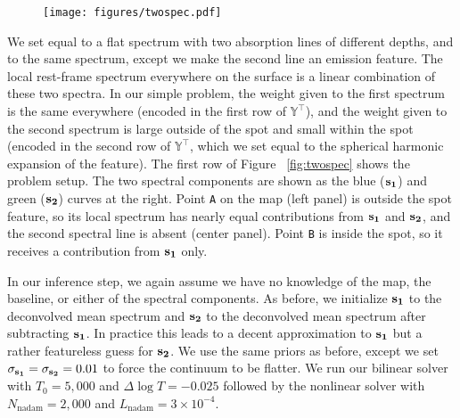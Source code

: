 \documentclass[modern]{aastex62}
\begin{document}
\begin{figure}[t!]
    \begin{centering}
    \texttt{[image: figures/twospec.pdf]}
    \end{centering}
\end{figure}
%
We set  equal to a flat spectrum with two absorption lines of
different depths, and  to the same spectrum, except we make the
second line an emission feature. The local rest-frame spectrum everywhere on the 
surface is a linear combination of these two spectra. In our simple problem,
the weight given to the first spectrum is the same everywhere (encoded in 
the first row of $\mathbb{Y}^\top$), and the weight
given to the second spectrum is large outside of the spot and small within
the spot (encoded in the second row of $\mathbb{Y}^\top$, which we set equal
to the spherical harmonic expansion of the \spot feature).
The first row of Figure ~\ref{fig:twospec} shows the problem setup. The two
spectral components are shown as the blue (${\mathbf{s_1}}$) and green
(${\mathbf{s_2}}$) curves at the right. Point \texttt{A} on the map (left panel)
is outside the spot feature, so its local spectrum has nearly equal
contributions from ${\mathbf{s_1}}$ and ${\mathbf{s_2}}$, and the second spectral
line is absent (center panel). Point \texttt{B} is inside the spot, so
it receives a contribution from ${\mathbf{s_1}}$ only.

In our inference step, we again assume we have no knowledge of the map,
the baseline, or either of the spectral components. As before, we initialize 
${\mathbf{s_1}}$ to the deconvolved mean spectrum and ${\mathbf{s_2}}$ to the
deconvolved mean spectrum after subtracting ${\mathbf{s_1}}$. In practice this
leads to a decent approximation to ${\mathbf{s_1}}$ but a rather featureless
guess for ${\mathbf{s_2}}$. We use the same priors as before, except we 
set $\sigma_{\mathbf{s_1}} = \sigma_{\mathbf{s_2}} = 0.01$ to force the continuum
to be flatter. We run our bilinear solver with $T_0 = 5,000$ and 
$\Delta\log T = -0.025$ followed by the nonlinear solver with
$N_\mathrm{nadam} = 2,000$ and $L_\mathrm{nadam} = 3\times 10^{-4}$.
\end{document}
